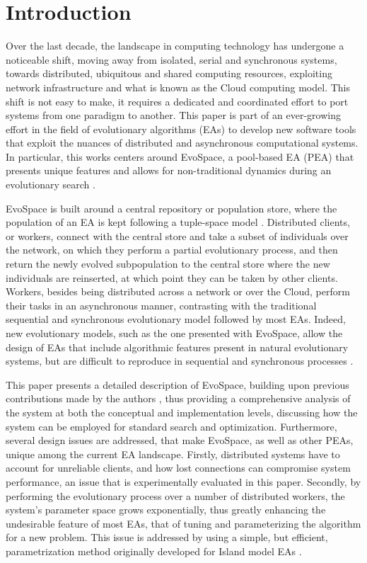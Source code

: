 \section{Introduction}
\label{sec:intro}
Over the last decade, the landscape in computing technology has undergone a noticeable shift, moving away from isolated, serial and synchronous systems,
towards distributed, ubiquitous and shared computing resources, exploiting network infrastructure and what is known as the Cloud computing model\cite{cloud, varia2008cloud}.
This shift is not easy to make, it requires a dedicated and coordinated effort to port systems from one paradigm to another.
This paper is part of an ever-growing effort in the field of evolutionary algorithms (EAs) to develop new software tools that exploit the nuances
of distributed and asynchronous computational systems.
In particular, this works centers around EvoSpace, a pool-based EA (PEA) that presents unique features and allows for non-traditional dynamics during
an evolutionary search \cite{Evospace}.

EvoSpace is built around a central repository or population store, where the population of an EA is kept following a tuple-space model \cite{linda}.
Distributed clients, or workers, connect with the central store and take a subset of individuals over the network, on which they perform a partial evolutionary
process, and then return the newly evolved subpopulation to the central store where the new individuals are reinserted, at which point they can be taken by other clients.
Workers, besides being distributed across a network or over the Cloud, perform their tasks in an asynchronous manner, contrasting with the traditional
sequential and synchronous evolutionary model followed by most EAs.
Indeed, new evolutionary models, such as the one presented with EvoSpace, allow the design of EAs that include algorithmic features present in natural evolutionary systems, but are difficult to reproduce in sequential and synchronous processes \cite{eiben}.

This paper presents a detailed description of EvoSpace, building upon previous contributions made by the authors \cite{Evospace,FreeLunch},
thus providing a comprehensive analysis of the system at both the conceptual and implementation levels, discussing how the system can be
employed for standard search and optimization.
Furthermore, several design issues are addressed, that make EvoSpace, as well as other PEAs, unique among the current EA landscape.
Firstly, distributed systems have to account for unreliable clients, and how lost connections can compromise system performance,
an issue that is experimentally evaluated in this paper.
Secondly, by performing the evolutionary process over a number of distributed workers, the system's parameter space grows exponentially,
thus greatly enhancing the undesirable feature of most EAs, that of tuning and parameterizing the algorithm for a new problem.
This issue is addressed by using a simple, but efficient, parametrization method originally developed for Island model EAs \cite{fuku2}.

